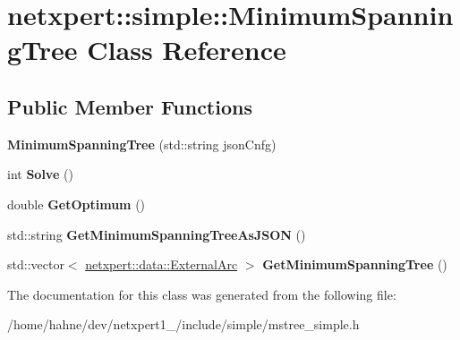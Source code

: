 \hypertarget{classnetxpert_1_1simple_1_1MinimumSpanningTree}{}\section{netxpert\+:\+:simple\+:\+:Minimum\+Spanning\+Tree Class Reference}
\label{classnetxpert_1_1simple_1_1MinimumSpanningTree}
\subsection*{Public Member Functions}
\begin{DoxyCompactItemize}
\item 
{\bfseries Minimum\+Spanning\+Tree} (std\+::string json\+Cnfg)\hypertarget{classnetxpert_1_1simple_1_1MinimumSpanningTree_a3f2cdeae5033766a054e20ed2ce02e3b}{}\label{classnetxpert_1_1simple_1_1MinimumSpanningTree_a3f2cdeae5033766a054e20ed2ce02e3b}

\item 
int {\bfseries Solve} ()\hypertarget{classnetxpert_1_1simple_1_1MinimumSpanningTree_abc9cd18efebd7c7fe5e449849f92530f}{}\label{classnetxpert_1_1simple_1_1MinimumSpanningTree_abc9cd18efebd7c7fe5e449849f92530f}

\item 
double {\bfseries Get\+Optimum} ()\hypertarget{classnetxpert_1_1simple_1_1MinimumSpanningTree_a27eb0c623199876d1fdace2c8f32e88b}{}\label{classnetxpert_1_1simple_1_1MinimumSpanningTree_a27eb0c623199876d1fdace2c8f32e88b}

\item 
std\+::string {\bfseries Get\+Minimum\+Spanning\+Tree\+As\+J\+S\+ON} ()\hypertarget{classnetxpert_1_1simple_1_1MinimumSpanningTree_a8200c69b26e1910f2c22ea3842027242}{}\label{classnetxpert_1_1simple_1_1MinimumSpanningTree_a8200c69b26e1910f2c22ea3842027242}

\item 
std\+::vector$<$ \hyperlink{structnetxpert_1_1data_1_1ExternalArc}{netxpert\+::data\+::\+External\+Arc} $>$ {\bfseries Get\+Minimum\+Spanning\+Tree} ()\hypertarget{classnetxpert_1_1simple_1_1MinimumSpanningTree_ad43de6f61435414777307a685b1ad46b}{}\label{classnetxpert_1_1simple_1_1MinimumSpanningTree_ad43de6f61435414777307a685b1ad46b}

\end{DoxyCompactItemize}


The documentation for this class was generated from the following file\+:\begin{DoxyCompactItemize}
\item 
/home/hahne/dev/netxpert1\+\_/include/simple/mstree\+\_\+simple.\+h\end{DoxyCompactItemize}
